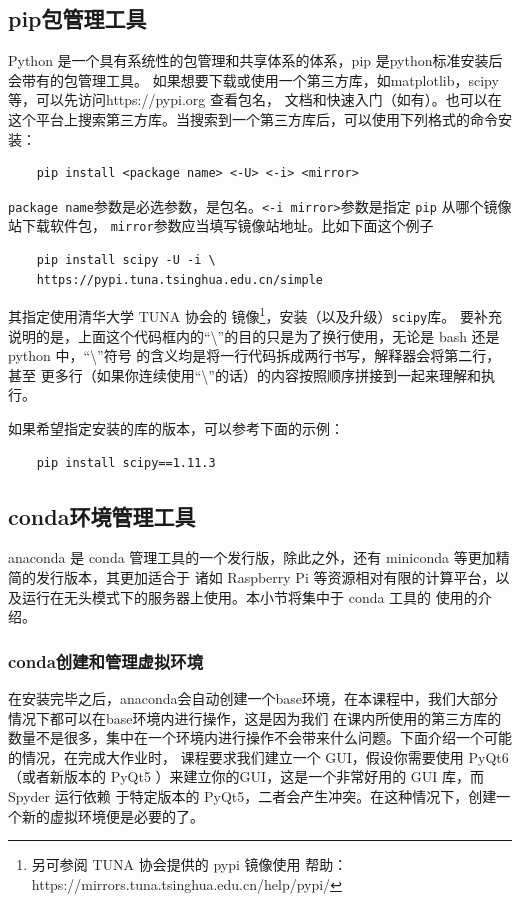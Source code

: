 \documentclass[UTF8]{ctexart}
\begin{document}
\subsection{pip包管理工具}
Python 是一个具有系统性的包管理和共享体系的体系，pip 是python标准安装后会带有的包管理工具。
如果想要下载或使用一个第三方库，如matplotlib，scipy等，可以先访问https://pypi.org 查看包名，
文档和快速入门（如有）。也可以在这个平台上搜索第三方库。当搜索到一个第三方库后，可以使用下列格式的命令安装：
\lstset{language=bash}
\begin{lstlisting}
    pip install <package name> <-U> <-i> <mirror>
\end{lstlisting}
\texttt{package name}参数是必选参数，是包名。\texttt{<-i mirror>}参数是指定 \texttt{pip} 从哪个镜像站下载软件包，
\texttt{mirror}参数应当填写镜像站地址。比如下面这个例子
\begin{lstlisting}
    pip install scipy -U -i \
    https://pypi.tuna.tsinghua.edu.cn/simple
\end{lstlisting}
其指定使用清华大学 TUNA 协会的
镜像\footnote{另可参阅 TUNA 协会提供的 pypi 镜像使用
帮助：\\https://mirrors.tuna.tsinghua.edu.cn/help/pypi/}，安装（以及升级）\texttt{scipy}库。
要补充说明的是，上面这个代码框内的“\textbackslash ”的目的只是为了换行使用，无论是 bash 还是 python 中，“\textbackslash ”符号
的含义均是将一行代码拆成两行书写，解释器会将第二行，甚至
更多行（如果你连续使用“\textbackslash ”的话）的内容按照顺序拼接到一起来理解和执行。

如果希望指定安装的库的版本，可以参考下面的示例：
\begin{lstlisting}
    pip install scipy==1.11.3
\end{lstlisting}
\subsection{conda环境管理工具}
anaconda 是 conda 管理工具的一个发行版，除此之外，还有 miniconda 等更加精简的发行版本，其更加适合于
诸如 Raspberry Pi 等资源相对有限的计算平台，以及运行在无头模式下的服务器上使用。本小节将集中于 conda 工具的
使用的介绍。

\subsubsection{conda创建和管理虚拟环境}
在安装完毕之后，anaconda会自动创建一个base环境，在本课程中，我们大部分情况下都可以在base环境内进行操作，这是因为我们
在课内所使用的第三方库的数量不是很多，集中在一个环境内进行操作不会带来什么问题。下面介绍一个可能的情况，在完成大作业时，
课程要求我们建立一个 GUI，假设你需要使用 PyQt6 （或者新版本的 PyQt5 ）来建立你的GUI，这是一个非常好用的 GUI 库，而 Spyder 运行依赖
于特定版本的 PyQt5，二者会产生冲突。在这种情况下，创建一个新的虚拟环境便是必要的了。
\end{document}
